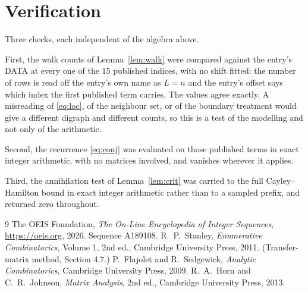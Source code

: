 \documentclass[11pt,a4paper]{article}
\theoremstyle{plain}
\theoremstyle{definition}
\begin{document}
\section{Verification}

Three checks, each independent of the algebra above.

First, the walk counts of Lemma~\ref{lem:walk} were compared against the entry's DATA at
every one of the $15$ published indices, with no shift fitted: the number of rows is
read off the entry's own name as $L=n$ and the entry's offset says which index the first
published term carries. The values agree exactly. A misreading of \eqref{eq:loc}, of the
neighbour set, or of the boundary treatment would give a different digraph and different
counts, so this is a test of the modelling and not only of the arithmetic.

Second, the recurrence \eqref{eq:conj} was evaluated on those published terms in exact
integer arithmetic, with no matrices involved, and vanishes wherever it applies.

Third, the annihilation test of Lemma~\ref{lem:crit} was carried to the full
Cayley--Hamilton bound in exact integer arithmetic rather than to a sampled prefix, and
returned zero throughout.

\begin{thebibliography}{9}
 The OEIS Foundation, \emph{The On-Line Encyclopedia of Integer
Sequences}, \url{https://oeis.org}, 2026. Sequence A189108.
 R.~P.~Stanley, \emph{Enumerative Combinatorics}, Volume 1, 2nd ed.,
Cambridge University Press, 2011. (Transfer-matrix method, Section 4.7.)
 P.~Flajolet and R.~Sedgewick, \emph{Analytic Combinatorics}, Cambridge
University Press, 2009.
 R.~A.~Horn and C.~R.~Johnson, \emph{Matrix Analysis}, 2nd ed., Cambridge
University Press, 2013.
\end{thebibliography}
\end{document}
